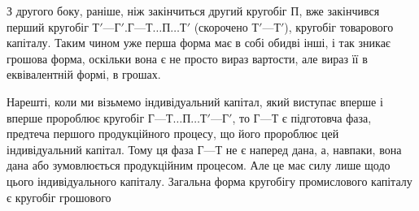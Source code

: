 З другого боку, раніше, ніж закінчиться другий кругобіг $П$, вже
закінчився перший кругобіг $Т' — Г'. Г — Т\dots{} П\dots{} Т'$ (скорочено $Т' — Т'$),
кругобіг товарового капіталу. Таким чином уже перша форма має в собі
обидві інші, і так зникає грошова форма, оскільки вона є не просто
вираз вартости, але вираз її в еквівалентній формі, в грошах.

Нарешті, коли ми візьмемо індивідуальний капітал, який виступає
вперше і вперше пророблює кругобіг $Г — Т\dots{} П\dots{} Т' — Г'$, то
$Г — Т$ є підготовча фаза, предтеча першого продукційного процесу, що
його пророблює цей індивідуальний капітал. Тому ця фаза $Г — Т$ не є
наперед дана, а, навпаки, вона дана або зумовлюється продукційним
процесом. Але це має силу лише щодо цього індивідуального капіталу.
Загальна форма кругобігу промислового капіталу є кругобіг грошового
\parbreak{}  %
